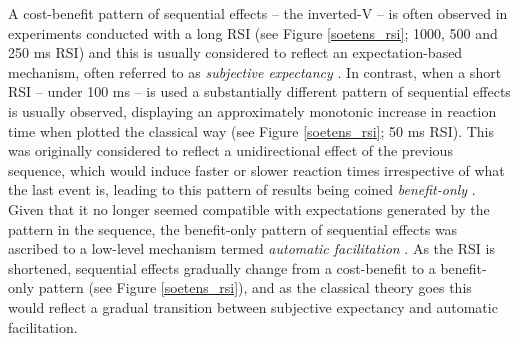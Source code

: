 \documentclass{apa}[12pt]
\begin{document}
A cost-benefit pattern of sequential effects -- the inverted-V -- is often observed in experiments conducted with a long RSI (see Figure \ref{soetens_rsi}; 1000, 500 and 250 ms RSI) and this is usually considered to reflect an expectation-based mechanism, often referred to as \textit{subjective expectancy} \cite{Kirby76,Soetens85}. In contrast, when a short RSI -- under 100 ms -- is used a substantially different pattern of sequential effects is usually observed, displaying an approximately monotonic increase in reaction time when plotted the classical way (see Figure \ref{soetens_rsi}; 50 ms RSI). This was originally considered to reflect a unidirectional effect of the previous sequence, which would induce faster or slower reaction times irrespective of what the last event is, leading to this pattern of results being coined \textit{benefit-only} \cite{Laming68,Soetens85}.\footnotemark{} Given that it no longer seemed compatible with expectations generated by the pattern in the sequence, the benefit-only pattern of sequential effects was ascribed to a low-level mechanism termed \textit{automatic facilitation} \cite{Soetens84,Soetens85}. As the RSI is shortened, sequential effects gradually change from a cost-benefit to a benefit-only pattern (see Figure \ref{soetens_rsi}), and as the classical theory goes this would reflect a gradual transition between subjective expectancy and automatic facilitation.

\end{document}
